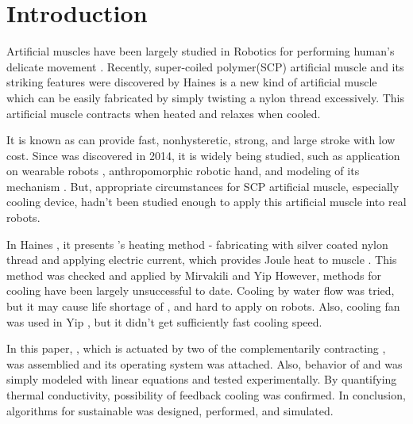 
\section{Introduction}
Artificial muscles have been largely studied in Robotics for performing human's delicate movement \cite{ashley}. Recently, super-coiled polymer(SCP) artificial muscle and its striking features were discovered by Haines \etal \cite{haines} \scp is a new kind of artificial muscle which can be easily fabricated by simply twisting a nylon thread excessively. This artificial muscle contracts when heated and relaxes when cooled.

It is known as \scp can provide fast, nonhysteretic, strong, and large stroke with low cost\cite{yuan, mirvakili, madden}. 
Since \scp was discovered in 2014, it is widely being studied, such as application on
wearable robots \cite{sphincter, kianzad2}, 
anthropomorphic robotic hand\cite{yip, finger}, 
and modeling of its mechanism \cite{treatise, torsional, youngmodulus, fab_coil, multiscale, healing, kianzad, moretti}. 
But, appropriate circumstances for SCP artificial muscle, especially cooling device, hadn't been studied enough to apply this artificial muscle into real robots.

In Haines \etal, it presents \scp 's heating method - fabricating \scp with silver coated nylon thread and applying electric current, which provides Joule heat to muscle \cite{haines}. This method was checked and applied by Mirvakili \etal and Yip \etal \cite{yip, mirvakili} However, methods for cooling \scp have been largely unsuccessful to date. 
Cooling by water flow was tried\cite{haines,finger}, but it may cause life shortage of \scp \cite{haines}, and hard to apply on robots. Also, cooling fan was used in Yip \etal, but it didn't get sufficiently fast cooling speed.

In this paper, \antanospace, which is actuated by two of the complementarily contracting \scpnospace, was assemblied and its operating system was attached. Also, behavior of \scp and \anta was simply modeled with linear equations and tested experimentally. By quantifying thermal conductivity, possibility of feedback cooling was confirmed. In conclusion, algorithms for sustainable \apc was designed, performed, and simulated.